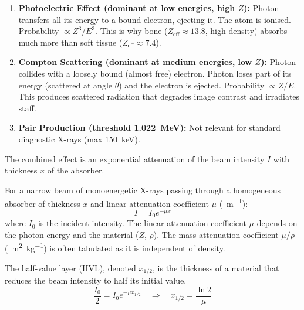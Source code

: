\documentclass[11pt]{article}
\newcommand{\cle}[1]{{\popxbold\color{popdark}#1}}
\begin{document}
\begin{enumerate}
    \item \textbf{Photoelectric Effect (dominant at low energies, high $Z$):} Photon transfers all its energy to a bound electron, ejecting it. The atom is ionised. Probability $\propto Z^3 / E^3$. This is why bone ($Z_{\text{eff}} \approx 13.8$, high density) absorbs much more than soft tissue ($Z_{\text{eff}} \approx 7.4$).
    \item \textbf{Compton Scattering (dominant at medium energies, low $Z$):} Photon collides with a loosely bound (almost free) electron. Photon loses part of its energy (scattered at angle $\theta$) and the electron is ejected. Probability $\propto Z / E$. This produces scattered radiation that degrades image contrast and irradiates staff.
    \item \textbf{Pair Production (threshold \SI{1.022}{MeV}):} Not relevant for standard diagnostic X-rays (max \SI{150}{keV}).
\end{enumerate}

The combined effect is an exponential attenuation of the beam intensity $I$ with thickness $x$ of the absorber.

\begin{propriete}
For a narrow beam of monoenergetic X-rays passing through a homogeneous absorber of thickness $x$ and linear attenuation coefficient $\mu$ (\SI{}{m^{-1}}):
\[
I = I_0 e^{-\mu x}
\]
where $I_0$ is the incident intensity. The \cle{linear attenuation coefficient} $\mu$ depends on the photon energy and the material ($Z$, $\rho$). The \cle{mass attenuation coefficient} $\mu/\rho$ (\SI{}{m^2.kg^{-1}}) is often tabulated as it is independent of density.
\end{propriete}

The \cle{half-value layer (HVL)}, denoted $x_{1/2}$, is the thickness of a material that reduces the beam intensity to half its initial value.
\[
\frac{I_0}{2} = I_0 e^{-\mu x_{1/2}} \quad \Rightarrow \quad x_{1/2} = \frac{\ln 2}{\mu}
\]
\end{document}
